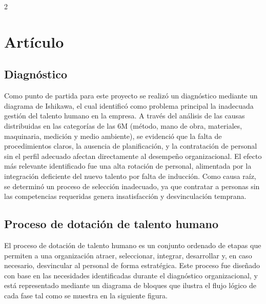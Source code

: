 \documentclass[12pt,spanish,Letterpaper,openany]{book}
\begin{document}
\begin {multicols}{2}
\hypertarget{artuxedculo-3}{%
\section{Artículo}\label{artuxedculo-3}}

\hypertarget{diagnuxf3stico}{%
\subsection{Diagnóstico}\label{diagnuxf3stico}}

Como punto de partida para este proyecto se realizó un diagnóstico mediante un diagrama de Ishikawa, el cual identificó como problema principal la inadecuada gestión del talento humano en la empresa. A través del análisis de las causas distribuidas en las categorías de las 6M (método, mano de obra, materiales, maquinaria, medición y medio ambiente), se evidenció que la falta de procedimientos claros, la ausencia de planificación, y la contratación de personal sin el perfil adecuado afectan directamente al desempeño organizacional. El efecto más relevante identificado fue una alta rotación de personal, alimentada por la integración deficiente del nuevo talento por falta de inducción. Como causa raíz, se determinó un proceso de selección inadecuado, ya que contratar a personas sin las competencias requeridas genera insatisfacción y desvinculación temprana.

\hypertarget{proceso-de-dotaciuxf3n-de-talento-humano}{%
\subsection{Proceso de dotación de talento humano}\label{proceso-de-dotaciuxf3n-de-talento-humano}}

El proceso de dotación de talento humano es un conjunto ordenado de etapas que permiten a una organización atraer, seleccionar, integrar, desarrollar y, en caso necesario, desvincular al personal de forma estratégica. Este proceso fue diseñado con base en las necesidades identificadas durante el diagnóstico organizacional, y está representado mediante un diagrama de bloques que ilustra el flujo lógico de cada fase tal como se muestra en la siguiente figura.

\begin {flushleft}
\noindent\begin{minipage}[c]{\columnwidth}

\textbf{}


\end{minipage}
\end{flushleft}
\end{multicols}
\end{document}
